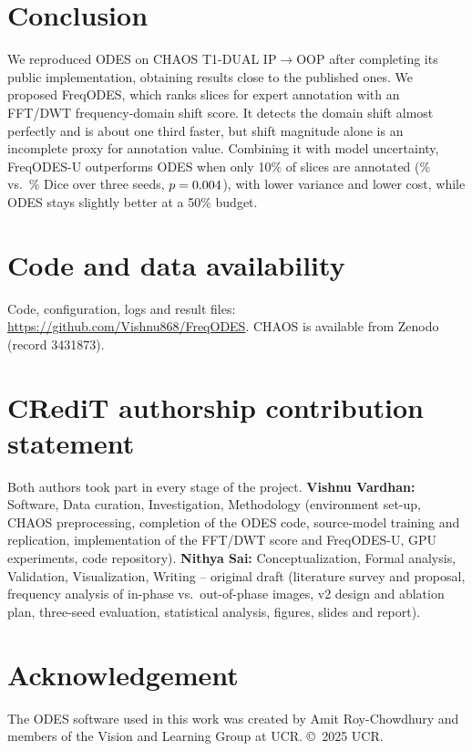 \documentclass[a4paper,fleqn]{cas-sc}
\begin{document}
\section{Conclusion}
We reproduced ODES on CHAOS T1-DUAL IP$\rightarrow$OOP after completing its public implementation, obtaining results close to the published ones. We proposed FreqODES, which ranks slices for expert annotation with an FFT/DWT frequency-domain shift score. It detects the domain shift almost perfectly and is about one third faster, but shift magnitude alone is an incomplete proxy for annotation value. Combining it with model uncertainty, FreqODES-U outperforms ODES when only 10\% of slices are annotated (\VFeTenMean\% vs.\ \VBnTenMean\% Dice over three seeds, $p=0.004$), with lower variance and lower cost, while ODES stays slightly better at a 50\% budget.

\section*{Code and data availability}
Code, configuration, logs and result files: \url{https://github.com/Vishnu868/FreqODES}. CHAOS is available from Zenodo (record 3431873).

\section*{CRediT authorship contribution statement}
Both authors took part in every stage of the project. \textbf{Vishnu Vardhan:} Software, Data curation, Investigation, Methodology (environment set-up, CHAOS preprocessing, completion of the ODES code, source-model training and replication, implementation of the FFT/DWT score and FreqODES-U, GPU experiments, code repository). \textbf{Nithya Sai:} Conceptualization, Formal analysis, Validation, Visualization, Writing -- original draft (literature survey and proposal, frequency analysis of in-phase vs.\ out-of-phase images, v2 design and ablation plan, three-seed evaluation, statistical analysis, figures, slides and report).
\section*{Acknowledgement}
The ODES software used in this work was created by Amit Roy-Chowdhury and members of the Vision and Learning Group at UCR. \copyright\ 2025 UCR.



\end{document}
